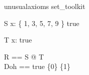 \documentclass{article}
\begin{document}
\begin{zsection}
\SECTION unusualaxioms \parents set\_toolkit
\end{zsection}

\begin{schema}{S}
   x: \{ 1, 3, 5, 7, 9 \}
\where
   true
\end{schema}

\begin{schema}{T}
   x: \nat
\where
   true
\end{schema}

\begin{zed}
   R == \forall S @ T
   \\
   Doh == \IF true \THEN \{0\} \ELSE \{1\}
\end{zed}
\end{document}

